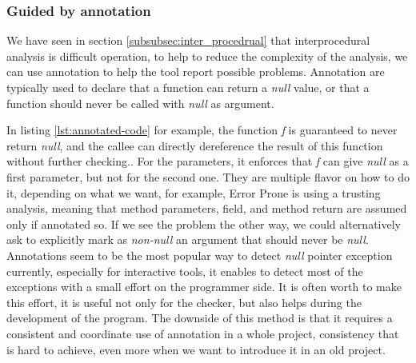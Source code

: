 \subsubsection{Guided by annotation}
\label{subsubsec:guided_by_annotation}

We have seen in section \ref{subsubsec:inter_procedrual} that interprocedural analysis is difficult operation, to help to reduce the complexity of the analysis, we can use annotation to help the tool report possible problems. 
Annotation are typically used to declare that a function can return a \emph{null} value, or that a function should never be called with \emph{null} as argument.



In listing \ref{lst:annotated-code} for example, the function \emph{f} is guaranteed to never return \emph{null}, and the callee can directly dereference the result of this function without further checking..
For the parameters, it enforces that \emph{f} can give \emph{null} as a first parameter, but not for the second one.\newline
They are multiple flavor on how to do it, depending on what we want, for example, Error Prone is using a trusting analysis, meaning that method parameters, field, and method return are assumed \nullable{} only if annotated so. 
If we see the problem the other way, we could alternatively ask to explicitly mark as \emph{non-null} an argument that should never be \emph{null}.\newline
Annotations seem to be the most popular way to detect \emph{null} pointer exception currently, especially for interactive tools, it enables to detect most of the exceptions with a small effort on the programmer side. 
It is often worth to make this effort, it is useful not only for the checker, but also helps during the development of the program.
The downside of this method is that it requires a consistent and coordinate use of annotation in a whole project, consistency that is hard to achieve, even more when we want to introduce it in an old project.

